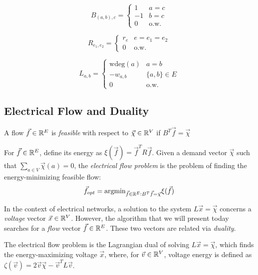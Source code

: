 \begin{minipage}[b]{0.33333\textwidth}
$$ B_{(a,b),c} = \begin{cases} 1 & a = c \\ -1 & b = c \\ 0 & \text{o.w.}\end{cases}$$
\end{minipage}%
\begin{minipage}[b]{0.33333\textwidth}
$$ R_{e_1,e_2} = \begin{cases} r_e & e = e_1 = e_2 \\ 0 & \text{o.w.} \end{cases}$$
\end{minipage}%
\begin{minipage}[b]{0.33333\textwidth}
$$ L_{a,b} = \begin{cases} \text{wdeg}(a) & a = b \\ -w_{a,b} & \{a,b\} \in E \\ 0 & \text{o.w.}\end{cases}$$
\end{minipage}

\subsection{Electrical Flow and Duality}
\label{section:electrical-flow-duality}
\begin{definition}[Feasible]
A flow $\vec f \in \mathbb R^E$ is \textit{feasible} with respect to $\vec \chi \in \mathbb R^V$ if $B^T\vec f = \vec \chi $
\end{definition}

For $\vec f \in \mathbb R^E$, define its energy as $\xi(\vec f) = \vec f^T R \vec f$. Given a demand vector $\vec \chi$ such that $\sum_{a \in V} \vec \chi(a) = 0$, the \textit{electrical flow problem} is the problem of finding the energy-minimizing feasible flow: 
$$ \vec f_{opt} = \text{argmin}_{\vec f \in \mathbb R^E : B^T\vec f = \vec \chi } \xi(\vec f)$$

In the context of electrical networks, a solution to the system $L \vec x = \vec \chi $ concerns a \textit{voltage} vector $\vec x \in \mathbb R^V$. However, the algorithm that we will present today searches for a \textit{flow} vector $\vec f \in \mathbb R^E$. These two vectors are related via \textit{duality}.  

The electrical flow problem is the Lagrangian dual of solving $L \vec x = \vec \chi$, which finds the energy-maximizing voltage $\vec x$, where, for $\vec v \in \mathbb R^V$, voltage energy is defined as $\zeta(\vec v) = 2\vec v \vec \chi - \vec v ^T L \vec v$. 

